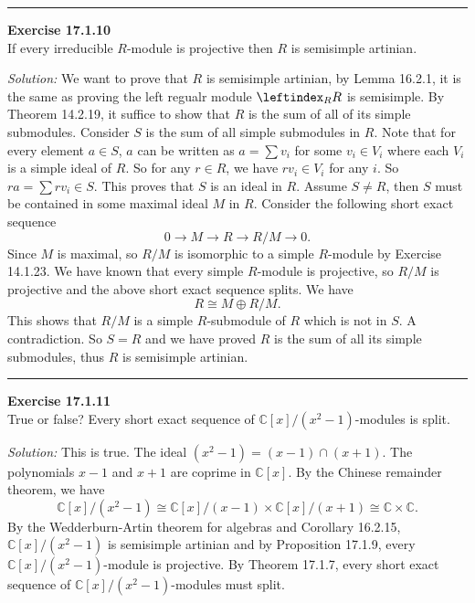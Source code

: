 \documentclass[a4paper, 12pt]{article}
\newenvironment{problem}[2][Exercise]
    { \begin{mdframed}[backgroundcolor=gray!20] \textbf{#1 #2} \\}
    {  \end{mdframed}}
\newenvironment{solution}
    {\textit{Solution:}}
    {}
\begin{document}
\noindent\rule{7in}{2.8pt}
\begin{problem}{17.1.10}
If every irreducible \(R\)-module is projective then \(R\) is semisimple artinian.
\end{problem}
\begin{solution}
We want to prove that \(R\) is semisimple artinian, by Lemma 16.2.1, it is the same as proving the left regualr module \(\leftindex_R R\) is semisimple. By Theorem 14.2.19, it suffice to show that \(R\) is the sum of all of 
its simple submodules. Consider \(S\) is the sum of all simple submodules in \(R\). Note that for every element \(a\in S\), \(a\) can be written as \(a=\sum v_i\) for some \(v_i\in V_i\) where each \(V_i\) is a simple ideal of \(R\). So for 
any \(r\in R\), we have \(rv_i\in V_i\) for any \(i\). So \(ra=\sum rv_i\in S\). This proves that \(S\) is an ideal in \(R\). Assume \(S\neq R\), then \(S\) must be contained in some maximal ideal \(M\) in \(R\). Consider the following short exact sequence 
\[0\rightarrow M\rightarrow R\rightarrow R/M\rightarrow 0.\]
Since \(M\) is maximal, so \(R/M\) is isomorphic to a simple \(R\)-module by Exercise 14.1.23. We have known that every simple \(R\)-module is projective, so \(R/M\) is projective and the above short exact sequence splits. We have 
\[R\cong M\oplus R/M.\]
This shows that \(R/M\) is a simple \(R\)-submodule of \(R\) which is not in \(S\). A contradiction. So \(S=R\) and we have proved \(R\) is the sum of all its simple submodules, thus \(R\) is semisimple artinian.
\end{solution}

\noindent\rule{7in}{2.8pt}
\begin{problem}{17.1.11}
True or false? Every short exact sequence of \(\mathbb{C}[x]/(x^2-1)\)-modules is split.
\end{problem}
\begin{solution}
This is true. The ideal \((x^2-1)=(x-1)\cap (x+1)\). The polynomials \(x-1\) and \(x+1\) are coprime in \(\mathbb{C}[x]\). By the Chinese remainder theorem, we have 
\[\mathbb{C}[x]/(x^2-1)\cong \mathbb{C}[x]/(x-1)\times \mathbb{C}[x]/(x+1)\cong \mathbb{C}\times \mathbb{C}.\]
By the Wedderburn-Artin theorem for algebras and Corollary 16.2.15, \(\mathbb{C}[x]/(x^2-1)\) is semisimple artinian and by Proposition 17.1.9, every \(\mathbb{C}[x]/(x^2-1)\)-module is projective. By Theorem 17.1.7, every short exact sequence of \(\mathbb{C}[x]/(x^2-1)\)-modules must split.
\end{solution}
\end{document}
